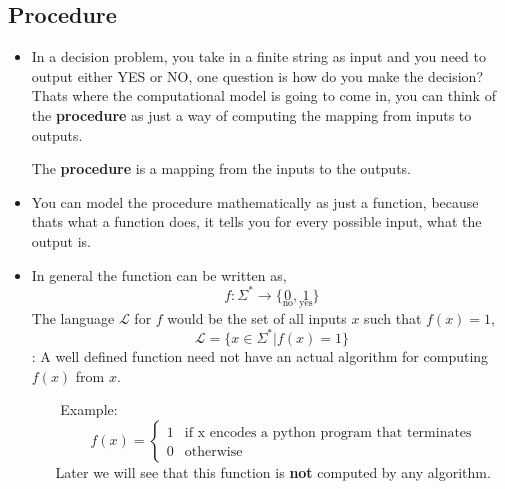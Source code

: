\documentclass{article}
\begin{document}

\subsection*{Procedure}
\begin{figure}[H]
    \caption*{}
\end{figure}

\begin{itemize}
    \item In a decision problem, you take in a finite string as input and you need to output either YES or NO, one question is how do you make the decision? Thats where the computational model is going to come in, you can think of the \textbf{procedure} as just a way of computing the mapping from inputs to outputs.
    \begin{tcolorbox} [title= Definition:, colback=black!10!white]
        The \textbf{procedure} is a mapping from the inputs to the outputs.
    \end{tcolorbox}
    \item You can model the procedure mathematically as just a function, because thats what a function does, it tells you for every possible input, what the output is.
    \item In general the function can be written as, $$f:\Sigma^*\rightarrow\{\underset{\text{no}}{0},\underset{\text{yes}}{1}\}$$
    The language $\mathcal{L}$ for $f$ would be the set of all inputs $x$ such that $f\left(x\right)=1$, $$ \mathcal{L}=\{x\in\Sigma^*|f(x)=1\}$$
    : A well defined function need not have an actual algorithm for computing $f\left(x\right)$ from $x$.
    \begin{itemize}
        \item [$ $] Example: 
        $$
            f\left(x\right) =
            \begin{cases}
                1 & \text{if x encodes a python program that terminates}\\
                0 & \text{otherwise}
            \end{cases}
        $$
        Later we will see that this function is \textbf{not} computed by any algorithm.
    \end{itemize}
\end{itemize}
\end{document}
